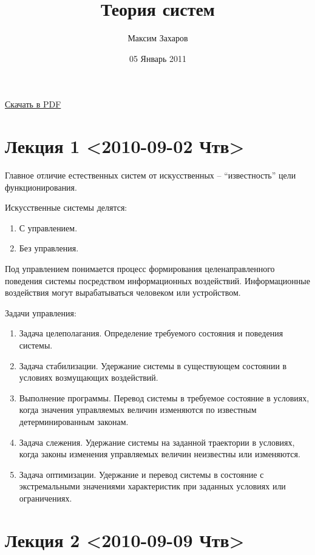 \documentclass[12pt, russian, oneside, article]{ncc}
\begin{document}
\title{Теория систем}
\author{Максим Захаров}
\date{05 Январь 2011}
\maketitle

\setcounter{tocdepth}{3}
\tableofcontents
\vspace*{1cm}

\href{file://~/Documents/Git/lectures/other~/Documents/Git/zamal.github.com/pdf/TS_Lectures.pdf}{Скачать в PDF}

\section{Лекция 1 <2010-09-02 Чтв>}
\label{sec-1}


Главное отличие естественных систем от искусственных -- ``известность'' цели функционирования.

Искусственные системы делятся:
\begin{enumerate}
\item С управлением.
\item Без управления.
\end{enumerate}

Под управлением понимается процесс формирования целенаправленного поведения системы посредством информационных воздействий. Информационные воздействия могут вырабатываться человеком или устройством.   
  
Задачи управления:
\begin{enumerate}
\item Задача целеполагания. Определение требуемого состояния и поведения системы.
\item Задача стабилизации. Удержание системы в существующем состоянии в условиях возмущающих воздействий.
\item Выполнение программы. Перевод системы в требуемое состояние в условиях, когда значения управляемых величин изменяются по известным детерминированным законам.
\item Задача слежения. Удержание системы на заданной траектории в условиях, когда законы изменения управляемых величин неизвестны или изменяются.
\item Задача оптимизации. Удержание и перевод системы в состояние с экстремальными значениями характеристик при заданных условиях или ограничениях.
\end{enumerate}
\section{Лекция 2 <2010-09-09 Чтв>}
\label{sec-2}
\end{document}
